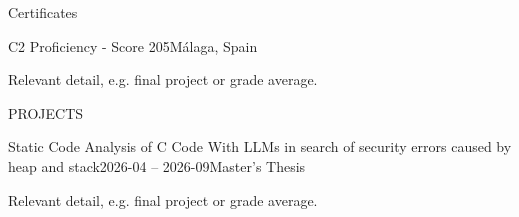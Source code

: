 \documentclass{resume} %
\begin{document}
\begin{rSection}{Certificates}
\begin{rSubsection}{C2 Proficiency - Score 205}{}{}{Málaga, Spain}
	\item Relevant detail, e.g. final project or grade average.
\end{rSubsection}
\end{rSection}


\begin{rSection}{PROJECTS}
	\begin{rSubsection}{Static Code Analysis of C Code With LLMs in search of security errors caused by
			heap and stack}{2026-04 -- 2026-09}{Master's Thesis}
		\item Relevant detail, e.g. final project or grade average.
	\end{rSubsection}
\end{rSection}
\end{document}
